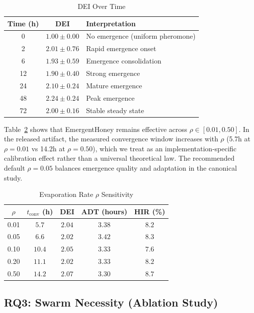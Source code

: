 \documentclass[review,3p,twocolumn]{elsarticle}
\begin{document}
\begin{table}[t]
\centering
\caption{DEI Over Time}
\label{tab:dei_time}
\small
\begin{tabular}{@{}ccl@{}}
\toprule
\textbf{Time (h)} & \textbf{DEI} & \textbf{Interpretation} \\
\midrule
0  & $1.00 \pm 0.00$ & No emergence (uniform pheromone) \\
2  & $2.01 \pm 0.76$ & Rapid emergence onset \\
6  & $1.93 \pm 0.59$ & Emergence consolidation \\
12 & $1.90 \pm 0.40$ & Strong emergence \\
24 & $2.10 \pm 0.24$ & Mature emergence \\
48 & $2.24 \pm 0.24$ & Peak emergence \\
72 & $2.00 \pm 0.16$ & Stable steady state \\
\bottomrule
\end{tabular}
\end{table}

Table~\ref{tab:rho} shows that EmergentHoney remains effective across $\rho \in [0.01, 0.50]$. In the released artifact, the measured convergence window increases with $\rho$ (5.7h at $\rho{=}0.01$ vs 14.2h at $\rho{=}0.50$), which we treat as an implementation-specific calibration effect rather than a universal theoretical law. The recommended default $\rho = 0.05$ balances emergence quality and adaptation in the canonical study.

\begin{table}[t]
\centering
\caption{Evaporation Rate $\rho$ Sensitivity}
\label{tab:rho}
\small
\begin{tabular}{@{}ccccc@{}}
\toprule
$\rho$ & $t_{\mathrm{conv}}$ (h) & DEI & ADT (hours) & HIR (\%) \\
\midrule
0.01 & $5.7$  & $2.04$ & $3.38$ & $8.2$ \\
0.05 & $6.6$  & $2.02$ & $3.42$ & $8.3$ \\
0.10 & $10.4$ & $2.05$ & $3.33$ & $7.6$ \\
0.20 & $11.1$ & $2.02$ & $3.33$ & $8.2$ \\
0.50 & $14.2$ & $2.07$ & $3.30$ & $8.7$ \\
\bottomrule
\end{tabular}
\end{table}


\subsection{RQ3: Swarm Necessity (Ablation Study)}
\end{document}
